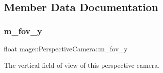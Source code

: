 \subsection{Member Data Documentation}
\hypertarget{classmage_1_1_perspective_camera_abdcf1a0cdd247e0f7e14e70898678af6}{}\label{classmage_1_1_perspective_camera_abdcf1a0cdd247e0f7e14e70898678af6} 
\subsubsection{\texorpdfstring{m\+\_\+fov\+\_\+y}{m\_fov\_y}}
{\footnotesize\ttfamily float mage\+::\+Perspective\+Camera\+::m\+\_\+fov\+\_\+y\hspace{0.3cm}{\ttfamily [private]}}

The vertical field-\/of-\/view of this perspective camera. 